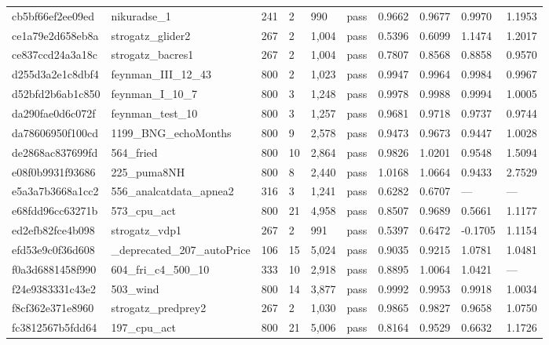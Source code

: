 \begin{longtable}{llllllllll}
cb5bf66ef2ee09ed & nikuradse\_1 & 241 & 2 & 990 & pass & 0.9662 & 0.9677 & 0.9970 & 1.1953\\
ce1a79e2d658eb8a & strogatz\_glider2 & 267 & 2 & 1,004 & pass & 0.5396 & 0.6099 & 1.1474 & 1.2017\\
ce837ccd24a3a18c & strogatz\_bacres1 & 267 & 2 & 1,004 & pass & 0.7807 & 0.8568 & 0.8858 & 0.9570\\
d255d3a2e1c8dbf4 & feynman\_III\_12\_43 & 800 & 2 & 1,023 & pass & 0.9947 & 0.9964 & 0.9984 & 0.9967\\
d52bfd2b6ab1c850 & feynman\_I\_10\_7 & 800 & 3 & 1,248 & pass & 0.9978 & 0.9988 & 0.9994 & 1.0005\\
da290fae0d6c072f & feynman\_test\_10 & 800 & 3 & 1,257 & pass & 0.9681 & 0.9718 & 0.9737 & 0.9744\\
da78606950f100cd & 1199\_BNG\_echoMonths & 800 & 9 & 2,578 & pass & 0.9473 & 0.9673 & 0.9447 & 1.0028\\
de2868ac837699fd & 564\_fried & 800 & 10 & 2,864 & pass & 0.9826 & 1.0201 & 0.9548 & 1.5094\\
e08f0b9931f93686 & 225\_puma8NH & 800 & 8 & 2,440 & pass & 1.0168 & 1.0664 & 0.9433 & 2.7529\\
e5a3a7b3668a1cc2 & 556\_analcatdata\_apnea2 & 316 & 3 & 1,241 & pass & 0.6282 & 0.6707 & --- & ---\\
e68fdd96cc63271b & 573\_cpu\_act & 800 & 21 & 4,958 & pass & 0.8507 & 0.9689 & 0.5661 & 1.1177\\
ed2efb82fce4b098 & strogatz\_vdp1 & 267 & 2 & 991 & pass & 0.5397 & 0.6472 & -0.1705 & 1.1154\\
efd53e9c0f36d608 & \_deprecated\_207\_autoPrice & 106 & 15 & 5,024 & pass & 0.9035 & 0.9215 & 1.0781 & 1.0481\\
f0a3d6881458f990 & 604\_fri\_c4\_500\_10 & 333 & 10 & 2,918 & pass & 0.8895 & 1.0064 & 1.0421 & ---\\
f24e9383331c43e2 & 503\_wind & 800 & 14 & 3,877 & pass & 0.9992 & 0.9953 & 0.9918 & 1.0034\\
f8cf362e371e8960 & strogatz\_predprey2 & 267 & 2 & 1,030 & pass & 0.9865 & 0.9827 & 0.9658 & 1.0750\\
fc3812567b5fdd64 & 197\_cpu\_act & 800 & 21 & 5,006 & pass & 0.8164 & 0.9529 & 0.6632 & 1.1726\\
\end{longtable}
\normalsize
